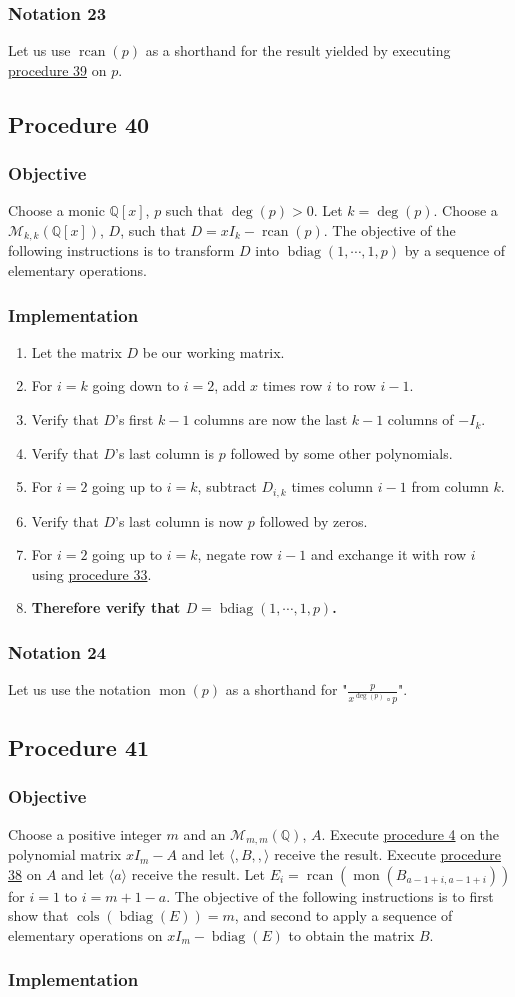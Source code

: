 \documentclass[twocolumn]{article}
\DeclareMathOperator{\bdiag}{bdiag}
\DeclareMathOperator{\rcan}{rcan}
\DeclareMathOperator{\mon}{mon}
\DeclareMathOperator{\cols}{cols}
\newcommand{\notation}[1]{\subsubsection*{Notation #1}}
\newcommand{\procedure}[2][]{\subsection*{Procedure #2 \ifthenelse{\equal{#1}{}}{}{(#1)}}\label{sec:procedure #2}}
\newcommand{\objective}{\subsubsection*{Objective}}
\newcommand{\implementation}{\subsubsection*{Implementation}}
\begin{document}
		\notation{23}
			Let us use $\rcan(p)$ as a shorthand for the result yielded by executing \hyperref[sec:procedure 39]{procedure 39} on $p$.
		\procedure{40}
			\objective
				Choose a monic $\mathbb{Q}[x]$, $p$ such that $\deg(p)>0$. Let $k=\deg(p)$. Choose a $\mathcal{M}_{k,k}(\mathbb{Q}[x])$, $D$, such that $D=xI_k-\rcan(p)$. The objective of the following instructions is to transform $D$ into $\bdiag(1,\cdots,1,p)$ by a sequence of elementary operations.
			\implementation
				\begin{enumerate}
					\item Let the matrix $D$ be our working matrix.
					\item For $i=k$ going down to $i=2$, add $x$ times row $i$ to row $i-1$.
					\item Verify that $D$'s first $k-1$ columns are now the last $k-1$ columns of $-I_k$.
					\item Verify that $D$'s last column is $p$ followed by some other polynomials.
					\item For $i=2$ going up to $i=k$, subtract $D_{i, k}$ times column $i-1$ from column $k$.
					\item Verify that $D$'s last column is now $p$ followed by zeros.
					\item For $i=2$ going up to $i=k$, negate row $i-1$ and exchange it with row $i$ using \hyperref[sec:procedure 33]{procedure 33}.
					\item \textbf{Therefore verify that $D=\bdiag(1,\cdots,1,p)$.}
				\end{enumerate}
		\notation{24}
			Let us use the notation $\mon(p)$ as a shorthand for "$\frac{p}{x^{\deg(p)}\circ p}$".
		\procedure{41}
			\objective
				Choose a positive integer $m$ and an $\mathcal{M}_{m,m}(\mathbb{Q})$, $A$. Execute \hyperref[sec:procedure 4]{procedure 4} on the polynomial matrix $xI_m-A$ and let $\langle,B,,\rangle$ receive the result. Execute \hyperref[sec:procedure 38]{procedure 38} on $A$ and let $\langle a\rangle$ receive the result. Let $E_i=\rcan(\mon(B_{a-1+i,a-1+i}))$ for $i=1$ to $i=m+1-a$. The objective of the following instructions is to first show that $\cols(\bdiag(E))=m$, and second to apply a sequence of elementary operations on $xI_m-\bdiag(E)$ to obtain the matrix $B$.
			\implementation
\end{document}
